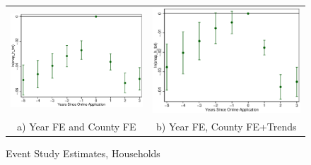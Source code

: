 \documentclass[11pt,letterpaper]{article}
\begin{document}
\begin{figure}\caption{Event Study Estimates, Households}
\begin{tabular}{cc}
\includegraphics[scale=0.57]{tabfig/evstu_snap_h_tot_one_yrcf_5_3}&\includegraphics[scale=0.57]{tabfig/evstu_snap_h_tot_one_yrcfsttr_5_3}\\
a) Year FE and County FE&b) Year FE, County FE+Trends\\

\end{tabular}
\end{figure}
\end{document}
